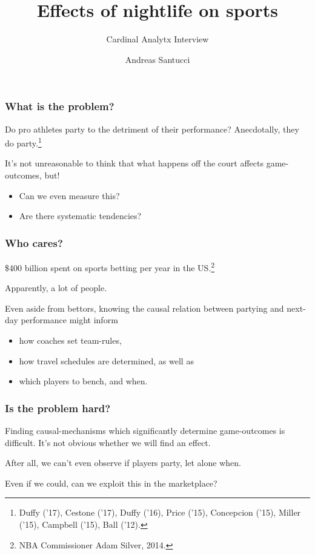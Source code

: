 \documentclass{beamer}
\author{Andreas Santucci} \institute{Stanford Teaching Fellow \\ Computational Math, Data Science} \title{Effects of nightlife on sports} \subtitle{Cardinal Analytx Interview} %
\begin{document}
  \begin{frame} \maketitle \end{frame}

\begin{frame}   \frametitle{What is the problem?}
  \begin{block}{Do pro athletes party to the detriment of their performance?}
    Anecdotally, they do party.\footnote{Duffy ('17), Cestone ('17), Duffy ('16), 
      Price ('15), Concepcion ('15), Miller ('15), Campbell ('15), Ball ('12).}

    \vspace{12pt}It's not unreasonable to think that what happens off the court affects game-outcomes, but!
    \begin{itemize}       \item Can we even measure this?
      \item Are there systematic tendencies?     \end{itemize}
  \end{block} \end{frame}

\begin{frame}   
  \frametitle{Who cares?}
  \begin{block}{\$400 billion spent on sports betting per year in the US.\footnote{NBA Commissioner Adam Silver, 2014.}}

    Apparently, a lot of people.

    \vspace{12pt}Even aside from bettors, knowing the causal relation between partying and next-day performance might inform
    \begin{itemize}       
      \item how coaches set team-rules, 
      \item how travel schedules are determined, as well as
      \item which players to bench, and when.
      \end{itemize}
  \end{block}
\end{frame}

\begin{frame}   
  \frametitle{Is the problem hard?}

  \begin{block}{Finding causal-mechanisms which significantly determine game-outcomes is difficult.}       It's not obvious whether we will find an effect. 

      \vspace{12pt}After all, we can't even observe if players party, let alone when.

      Even if we could, can we exploit this in the marketplace?   \end{block}

\end{frame}
\end{document}

